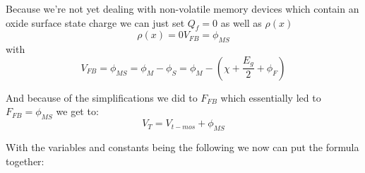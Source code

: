 Because we're not yet dealing with non-volatile memory devices which contain an oxide surface state charge we can just set $Q_f=0$ as well as $\rho(x)$
\begin{equation}
\rho(x)=0
V_{FB}
=
\phi_{MS}
\end{equation}
with
\begin{equation}
V_{FB}
=
\phi_{MS}
=
\phi_{M} - \phi_{S}
=
\phi_{M} -  \left(\chi + \frac{E_g}{2} + \phi_F \right)
\end{equation}

And because of the simplifications we did to $F_{FB}$ which essentially led to $F_{FB}=\phi_{MS}$ we get to:
\begin{equation}
V_T = V_{t-mos} + \phi_{MS}
\end{equation}

With the variables and constants being the following we now can put the formula together:
